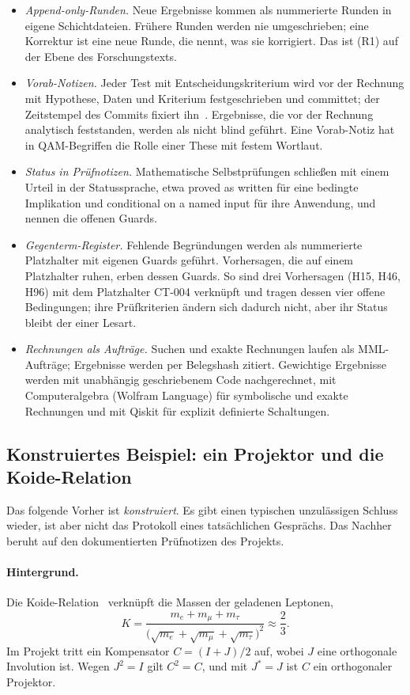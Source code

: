 \begin{itemize}[nosep]
\item \emph{Append-only-Runden.} Neue Ergebnisse kommen als nummerierte Runden in eigene Schichtdateien. Frühere Runden werden nie
umgeschrieben; eine Korrektur ist eine neue Runde, die nennt, was sie korrigiert. Das ist (R1) auf der Ebene des Forschungstexts.
\item \emph{Vorab-Notizen.} Jeder Test mit Entscheidungskriterium wird vor der Rechnung mit Hypothese, Daten und Kriterium festgeschrieben
und committet; der Zeitstempel des Commits fixiert ihn~\cite{nosek}. Ergebnisse, die vor der Rechnung analytisch feststanden, werden als
\glqq nicht blind\grqq{} geführt. Eine Vorab-Notiz hat in QAM-Begriffen die Rolle einer These mit festem Wortlaut.
\item \emph{Status in Prüfnotizen.} Mathematische Selbstprüfungen schließen mit einem Urteil in der Statussprache, etwa \glqq proved as
written\grqq{} für eine bedingte Implikation und \glqq conditional on a named input\grqq{} für ihre Anwendung, und nennen die offenen Guards.
\item \emph{Gegenterm-Register.} Fehlende Begründungen werden als nummerierte Platzhalter mit eigenen Guards geführt. Vorhersagen, die
auf einem Platzhalter ruhen, erben dessen Guards. So sind drei Vorhersagen (H15, H46, H96) mit dem Platzhalter CT-004 verknüpft und tragen
dessen vier offene Bedingungen; ihre Prüfkriterien ändern sich dadurch nicht, aber ihr Status bleibt der einer Lesart.
\item \emph{Rechnungen als Aufträge.} Suchen und exakte Rechnungen laufen als MML-Aufträge; Ergebnisse werden per Belegshash zitiert.
Gewichtige Ergebnisse werden mit unabhängig geschriebenem Code nachgerechnet, mit Computeralgebra (Wolfram Language) für symbolische und
exakte Rechnungen und mit Qiskit für explizit definierte Schaltungen.
\end{itemize}

\subsection{Konstruiertes Beispiel: ein Projektor und die Koide-Relation}

Das folgende \glqq Vorher\grqq{} ist \emph{konstruiert}. Es gibt einen typischen unzulässigen Schluss wieder, ist aber nicht das Protokoll
eines tatsächlichen Gesprächs. Das \glqq Nachher\grqq{} beruht auf den dokumentierten Prüfnotizen des Projekts.

\paragraph{Hintergrund.} Die Koide-Relation~\cite{koide} verknüpft die Massen der geladenen Leptonen,
\[
K=\frac{m_e+m_\mu+m_\tau}{\bigl(\sqrt{m_e}+\sqrt{m_\mu}+\sqrt{m_\tau}\bigr)^2}\approx\frac23 .
\]
Im Projekt tritt ein Kompensator \(C=(I+J)/2\) auf, wobei \(J\) eine orthogonale Involution ist. Wegen \(J^2=I\) gilt \(C^2=C\), und mit
\(J^*=J\) ist \(C\) ein orthogonaler Projektor.

